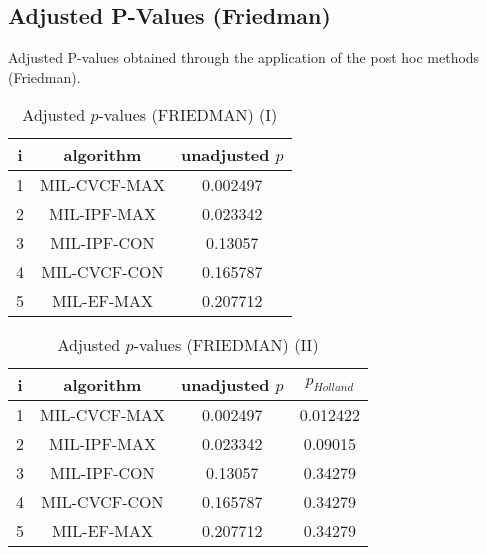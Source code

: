 \documentclass[a4paper,10pt]{article}
\begin{document}
\begin{landscape}
\newpage

\section{Adjusted P-Values (Friedman)}


Adjusted P-values obtained through the application of the post hoc methods (Friedman).

\begin{table}[!htp]
\centering\small
\begin{tabular}{ccc}
i&algorithm&unadjusted $p$\\
\hline1&MIL-CVCF-MAX&0.002497\\2&MIL-IPF-MAX&0.023342\\3&MIL-IPF-CON&0.13057\\4&MIL-CVCF-CON&0.165787\\5&MIL-EF-MAX&0.207712\\\hline
\end{tabular}
\caption{Adjusted $p$-values (FRIEDMAN) (I)}
\end{table}
\begin{table}[!htp]
\centering\small
\begin{tabular}{cccc}
i&algorithm&unadjusted $p$&$p_{Holland}$\\
\hline1&MIL-CVCF-MAX&0.002497&0.012422\\2&MIL-IPF-MAX&0.023342&0.09015\\3&MIL-IPF-CON&0.13057&0.34279\\4&MIL-CVCF-CON&0.165787&0.34279\\5&MIL-EF-MAX&0.207712&0.34279\\\hline
\end{tabular}
\caption{Adjusted $p$-values (FRIEDMAN) (II)}
\end{table}

\newpage
\end{landscape}
\end{document}
